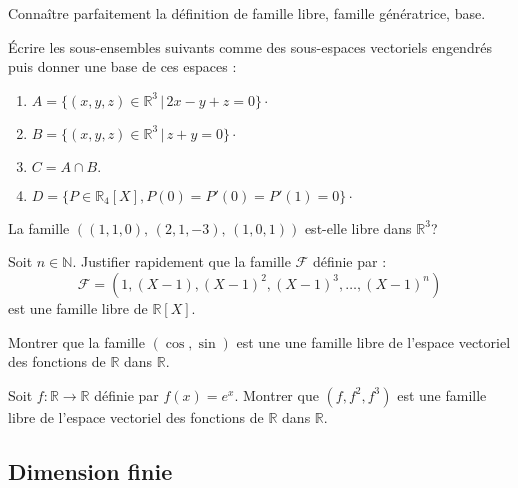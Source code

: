 \documentclass[a4paper,twoside,french,11pt]{VcCours}
\begin{document}
\begin{ptc}{}
	Connaître parfaitement la définition de famille libre, famille génératrice, base.
\end{ptc}

\begin{Exercice}{}
  Écrire les sous-ensembles suivants comme des sous-espaces vectoriels engendrés puis donner une base de ces espaces :
  
  \begin{enumerate}
    \item $A=\lbrace (x,y,z) \in \mathbb{R}^3 \, \vert  \, 2x-y+z=0 \rbrace \cdot$
    \item $B= \lbrace (x,y,z) \in \mathbb{R}^3 \, \vert \, z+y=0 \rbrace \cdot$
    \item $C= A \cap B.$
    \item $D = \lbrace P \in \mathbb{R}_4[X], P(0)=P'(0)=P'(1)=0 \rbrace \cdot$
  \end{enumerate}
\end{Exercice} 
  
\begin{Exercice}{}
  La famille $((1,1,0), \, (2,1,-3), \, (1,0,1))$ est-elle libre dans $\mathbb{R}^3$?
\end{Exercice} 

\begin{Exercice}{}
  Soit $n \in \mathbb{N}$. Justifier rapidement que la famille $\mathcal{F}$ définie par :
  $$ \mathcal{F} = (1, (X-1), (X-1)^2, (X-1)^3, \ldots, (X-1)^n)$$
  est une famille libre de $\mathbb{R}[X]$.
\end{Exercice} 
  
\begin{Exercice}{}
  Montrer que la famille $(\cos, \sin)$ est une une famille libre de l'espace vectoriel des fonctions de $\mathbb{R}$ dans $\mathbb{R}$.
\end{Exercice} 

\begin{Exercice}{}
  Soit $f : \mathbb{R} \rightarrow \mathbb{R}$ définie par $f(x)=e^x$. Montrer que $(f,f^2,f^3)$ est une famille libre de l'espace vectoriel des fonctions de $\mathbb{R}$ dans $\mathbb{R}$.
\end{Exercice} 

\subsection{Dimension finie}
\end{document}
